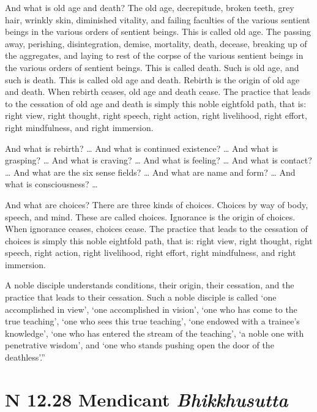\documentclass[12pt,openany]{book}%
\newcommand*{\suttatitleacronym}[1]{\smaller[2]{#1}\vspace*{.3em}}
\newcommand*{\suttatitletranslation}[1]{\linebreak{#1}}
\newcommand*{\suttatitleroot}[1]{\linebreak\smaller[2]\itshape{#1}}
\newcommand*{\tocacronym}[1]{\hspace*{-3.3em}{#1}\quad}
\newcommand*{\toctranslation}[1]{#1}
\newcommand*{\tocroot}[1]{(\textit{#1})}
\begin{document}
And what is old age and death? The old age, decrepitude, broken teeth, grey hair, wrinkly skin, diminished vitality, and failing faculties of the various sentient beings in the various orders of sentient beings. This is called old age. The passing away, perishing, disintegration, demise, mortality, death, decease, breaking up of the aggregates, and laying to rest of the corpse of the various sentient beings in the various orders of sentient beings. This is called death. Such is old age, and such is death. This is called old age and death. Rebirth is the origin of old age and death. When rebirth ceases, old age and death cease. The practice that leads to the cessation of old age and death is simply this noble eightfold path, that is: right view, right thought, right speech, right action, right livelihood, right effort, right mindfulness, and right immersion. 

And what is rebirth? … And what is continued existence? … And what is grasping? … And what is craving? … And what is feeling? … And what is contact? … And what are the six sense fields? … And what are name and form? … And what is consciousness? … 

And what are choices? There are three kinds of choices. Choices by way of body, speech, and mind. These are called choices. Ignorance is the origin of choices. When ignorance ceases, choices cease. The practice that leads to the cessation of choices is simply this noble eightfold path, that is: right view, right thought, right speech, right action, right livelihood, right effort, right mindfulness, and right immersion. 

A noble disciple understands conditions, their origin, their cessation, and the practice that leads to their cessation. Such a noble disciple is called ‘one accomplished in view’, ‘one accomplished in vision’, ‘one who has come to the true teaching’, ‘one who sees this true teaching’, ‘one endowed with a trainee’s knowledge’, ‘one who has entered the stream of the teaching’, ‘a noble one with penetrative wisdom’, and ‘one who stands pushing open the door of the deathless’.” 

%
\section*{{\suttatitleacronym SN 12.28}{\suttatitletranslation A Mendicant }{\suttatitleroot Bhikkhusutta}}
\addcontentsline{toc}{section}{\tocacronym{SN 12.28} \toctranslation{A Mendicant } \tocroot{Bhikkhusutta}}
\end{document}
